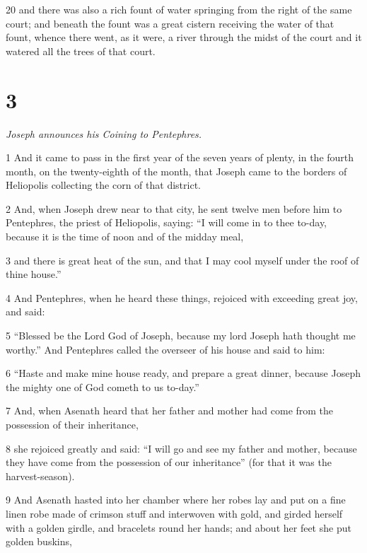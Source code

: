 \par 20 and there was also a rich fount of water springing from the right of the same court; and beneath the fount was a great cistern receiving the water of that fount, whence there went, as it were, a river through the midst of the court and it watered all the trees of that court. 

\chapter{3}

\textit{Joseph announces his Coining to Pentephres.}

\par 1 And it came to pass in the first year of the seven years of plenty, in the fourth month, on the twenty-eighth of the month, that Joseph came to the borders of Heliopolis collecting the corn of that district. 

\par 2 And, when Joseph drew near to that city, he sent twelve men before him to Pentephres, the priest of Heliopolis, saying: “I will come in to thee to-day, because it is the time of noon and of the midday meal, 

\par 3 and there is great heat of the sun, and that I may cool myself under the roof of thine house.” 

\par 4 And Pentephres, when he heard these things, rejoiced with exceeding great joy, and said: 

\par 5 “Blessed be the Lord God of Joseph, because my lord Joseph hath thought me worthy.” And Pentephres called the overseer of his house and said to him: 

\par 6 “Haste and make mine house ready, and prepare a great dinner, because Joseph the mighty one of God cometh to us to-day.” 

\par 7 And, when Asenath heard that her father and mother had come from the possession of their inheritance, 

\par 8 she rejoiced greatly and said: “I will go and see my father and mother, because they have come from the possession of our inheritance” (for that it was the harvest-season). 

\par 9 And Asenath hasted into her chamber where her robes lay and put on a fine linen robe made of crimson stuff and interwoven with gold, and girded herself with a golden girdle, and bracelets round her hands; and about her feet she put golden buskins, 

